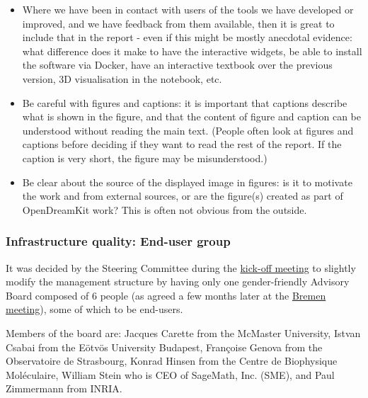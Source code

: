 \begin{itemize}
\item Where we have been in contact with users of the tools we have
developed or improved, and we have feedback from them available,
then it is great to include that in the report - even if this might
be mostly anecdotal evidence: what difference does it make to have
the interactive widgets, be able to install the software via Docker,
have an interactive textbook over the previous version, 3D
visualisation in the notebook, etc.

\item Be careful with figures and captions: it is important that captions
describe what is shown in the figure, and that the content of figure
and caption can be understood without reading the main text. (People
often look at figures and captions before deciding if they want to
read the rest of the report. If the caption is very short, the
figure may be misunderstood.)

\item Be clear about the source of the displayed image in figures: is it
to motivate the work and from external sources, or are the figure(s)
created as part of OpenDreamKit work? This is often not obvious from
the outside.
\end{itemize}



\subsubsection{Infrastructure quality: End-user group}


It was decided by the Steering Committee during the
\href{http://opendreamkit.org/meetings/2015-09-02-Kickoff/management_structure/}{kick-off
  meeting} to slightly modify the management structure by having only
one gender-friendly Advisory Board composed of 6 people (as agreed a
few months later at the
\href{http://opendreamkit.org/meetings/2016-06-27-Bremen/minutes/}{Bremen
  meeting}), some of which to be end-users.

Members of the board are: Jacques Carette from the McMaster University, Istvan Csabai from the Eötvös University Budapest,
Françoise Genova from the Observatoire de Strasbourg, Konrad Hinsen from the Centre de Biophysique Moléculaire,
William Stein who is CEO of SageMath, Inc. (SME), and Paul Zimmermann from INRIA.


